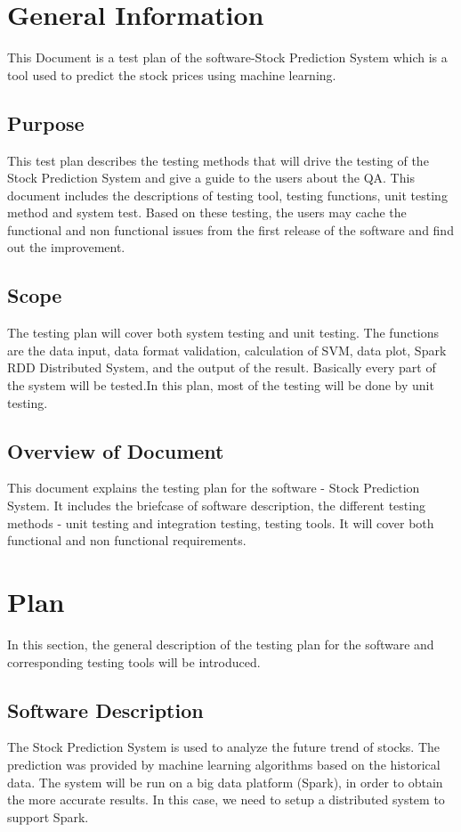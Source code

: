 \documentclass[12pt, titlepage]{article}
\begin{document}
\section{General Information}
This Document is a test plan of the software-Stock Prediction System which is a tool used to predict the stock prices using machine learning. 

\subsection{Purpose}
This test plan describes the testing methods that will drive the testing of the Stock Prediction System and give a guide to the users about the QA. This document includes the descriptions of testing tool, testing functions, unit testing method and system test. Based on these testing, the users may cache the functional and non functional issues from the first release of the software and find out the improvement. 
\subsection{Scope}
The testing plan will cover both system testing and unit testing. The functions are the data input, data format validation, calculation of SVM, data plot, Spark RDD Distributed System, and the output of the result. Basically every part of the system will be tested.In this plan, most of the testing will be done by unit testing.
\subsection{Overview of Document}
This document explains the testing plan for the software - Stock Prediction System. It includes the briefcase of software description, the different testing methods - unit testing and integration testing, testing tools. It will cover both functional and non functional requirements. 
\section{Plan}
In this section, the general description of the testing plan for the software and corresponding testing tools will be introduced.
\subsection{Software Description}
The Stock Prediction System is used to analyze the future trend of stocks. The prediction was provided by machine learning algorithms based on the historical data. 
The system will be run on a big data platform (Spark), in order to obtain the more accurate results. In this case, we need to setup a distributed system to support Spark.
\end{document}
